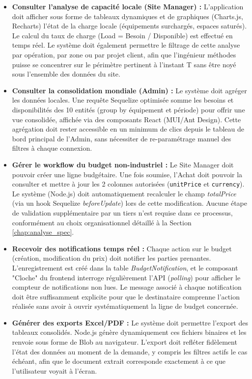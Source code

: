 \begin{itemize}
    \item \textbf{Consulter l'analyse de capacité locale (Site Manager) :} L'application doit afficher sous forme de tableaux dynamiques et de graphiques (Charts.js, Recharts) l'état de la charge locale (équipements surchargés, espaces saturés). Le calcul du taux de charge (Load = Besoin / Disponible) est effectué en temps réel. Le système doit également permettre le filtrage de cette analyse par opération, par zone ou par projet client, afin que l'ingénieur méthodes puisse se concentrer sur le périmètre pertinent à l'instant T sans être noyé sous l'ensemble des données du site.
    
    \item \textbf{Consulter la consolidation mondiale (Admin) :} Le système doit agréger les données locales. Une requête Sequelize optimisée somme les besoins et disponibilités des 10 entités (group by équipement et période) pour offrir une vue consolidée, affichée via des composants React (MUI/Ant Design). Cette agrégation doit rester accessible en un minimum de clics depuis le tableau de bord principal de l'Admin, sans nécessiter de re-paramétrage manuel des filtres à chaque connexion.
    
    \item \textbf{Gérer le workflow du budget non-industriel :} Le Site Manager doit pouvoir créer une ligne budgétaire. Une fois soumise, l'Achat doit pouvoir la consulter et mettre à jour les 2 colonnes autorisées (\texttt{unitPrice} et \texttt{currency}). Le système (Node.js) doit automatiquement recalculer le champ \textit{totalPrice} (via un hook Sequelize \textit{beforeUpdate}) lors de cette modification. Aucune étape de validation supplémentaire par un tiers n'est requise dans ce processus, conformément au choix organisationnel détaillé à la Section \ref{chap:analyse_spec}.
    
    \item \textbf{Recevoir des notifications temps réel :} Chaque action sur le budget (création, modification du prix) doit notifier les parties prenantes. L'enregistrement est créé dans la table \textit{BudgetNotification}, et le composant "Cloche" du frontend interroge régulièrement l'API (\textit{polling}) pour afficher le compteur de notifications non lues. Le message associé à chaque notification doit être suffisamment explicite pour que le destinataire comprenne l'action réalisée sans avoir à ouvrir systématiquement la ligne de budget concernée.
    
    \item \textbf{Générer des exports Excel/PDF :} Le système doit permettre l'export des tableaux consolidés. Node.js génère dynamiquement ces fichiers binaires et les renvoie sous forme de Blob au navigateur. L'export doit refléter fidèlement l'état des données au moment de la demande, y compris les filtres actifs le cas échéant, afin que le document extrait corresponde exactement à ce que l'utilisateur voyait à l'écran.
\end{itemize}

